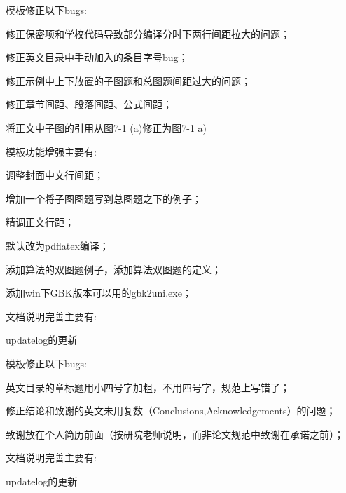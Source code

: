 模板修正以下bugs:
\begin{hitlist}
\item 修正保密项和学校代码导致部分编译分时下两行间距拉大的问题；
\item 修正英文目录中手动加入的条目字号bug；
\item 修正示例中上下放置的子图题和总图题间距过大的问题；
\item 修正章节间距、段落间距、公式间距；
\item 将正文中子图的引用从图7-1 (a)修正为图7-1 a)
\end{hitlist}

模板功能增强主要有:
\begin{hitlist}
\item 调整封面中文行间距；
\item 增加一个将子图图题写到总图题之下的例子；
\item 精调正文行距；
\item 默认改为pdflatex编译；
\item 添加算法的双图题例子，添加算法双图题的定义；
\item 添加win下GBK版本可以用的gbk2uni.exe；
\end{hitlist}

文档说明完善主要有:
\begin{hitlist}
  \item updatelog的更新
\end{hitlist}


模板修正以下bugs:
\begin{hitlist}
\item 英文目录的章标题用小四号字加粗，不用四号字，规范上写错了； 
\item 修正结论和致谢的英文未用复数（Conclusions,Acknowledgements）的问题；
\item 致谢放在个人简历前面（按研院老师说明，而非论文规范中致谢在承诺之前）；
\end{hitlist}


文档说明完善主要有:
\begin{hitlist}
  \item updatelog的更新
\end{hitlist}


